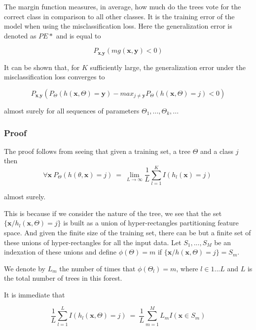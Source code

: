 The margin function measures, in average, how much do the trees vote for the correct class in comparison to all other classes. It is the training error of the model when using the misclassification loss. Here the generalization error is denoted as $PE*$ and is equal to  

\begin{equation}
P_{\textbf{x}, \textbf{y} }(mg(\textbf{x},\textbf{y}) <0)
\end{equation}

 It can be shown that, for $K$ sufficiently large, the generalization error under the misclassification loss converges to

\begin{equation}
 P_{\textbf{x}, \textbf{y} } ( P_{\Theta} (h(\textbf{x}, \Theta) = \textbf{y}) - max_{j \neq \textbf{y}} P_{\Theta} (h(\textbf{x}, \Theta) = j) < 0) 
 \end{equation}

almost surely for all sequences of parameters $\Theta_1, ..., \Theta_k,...$

\subsubsection{Proof}
The proof follows from seeing that given a training set, a tree $\Theta$ and a class $j$ then
\begin{equation}
\forall \textbf{x}   \ P_\Theta(h(\theta,\textbf{x}) = j) \ = \
\lim_{L\to\infty} \frac{1}{L} \sum_{l=1}^K I(h_l(\textbf{x}) = j) \  
\end{equation}

almost surely.

This is because if we consider the nature of the tree, we see that the set $\{\textbf{x} / h_l(\textbf{x}, \Theta) = j \}$ is built as a union of hyper-rectangles partitioning feature space. And given the finite size of the training set, there can be but a finite set of these unions of hyper-rectangles for all the input data. Let $S_1, ..., S_M$ be an indexation of these unions and define $\phi(\Theta) = m $ if $\{\textbf{x} / h(\textbf{x}, \Theta) = j \} = S_m$.

We denote by $L_m$ the number of times that $\phi(\Theta_l) =m $, where $l \in {1...L}$ and $L$ is the total number of trees in this forest.

It is immediate that

\begin{equation}\label{rf-PEconvergence1}
\frac{1}{L} \sum_{l=1}^L I(h_l(\textbf{x},\Theta) = j) \ = \  \frac{1}{L} \sum_{m=1}^M L_m I(\textbf{x} \in S_m)
\end{equation}

